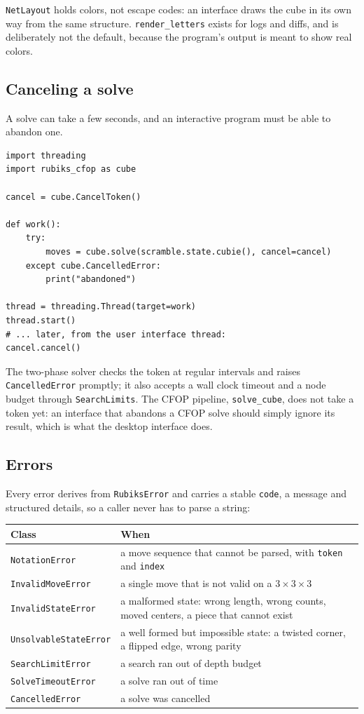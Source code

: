\texttt{NetLayout} holds colors, not escape codes: an interface draws the cube in
its own way from the same structure.  \texttt{render\_letters} exists for logs and
diffs, and is deliberately not the default, because the program's output is meant to
show real colors.

\subsection{Canceling a solve}

A solve can take a few seconds, and an interactive program must be able to abandon
one.

\begin{lstlisting}[style=python]
import threading
import rubiks_cfop as cube

cancel = cube.CancelToken()

def work():
    try:
        moves = cube.solve(scramble.state.cubie(), cancel=cancel)
    except cube.CancelledError:
        print("abandoned")

thread = threading.Thread(target=work)
thread.start()
# ... later, from the user interface thread:
cancel.cancel()
\end{lstlisting}

The two-phase solver checks the token at regular intervals and raises
\texttt{CancelledError} promptly; it also accepts a wall clock timeout and a node
budget through \texttt{SearchLimits}.  The CFOP pipeline, \texttt{solve\_cube}, does
not take a token yet: an interface that abandons a CFOP solve should simply ignore
its result, which is what the desktop interface does.

\subsection{Errors}

Every error derives from \texttt{RubiksError} and carries a stable \texttt{code}, a
message and structured details, so a caller never has to parse a string:

\begin{center}
\begin{tabular}{@{}ll@{} }
\toprule
Class & When \\
\midrule
\texttt{NotationError} & a move sequence that cannot be parsed, with
\texttt{token} and \texttt{index} \\
\texttt{InvalidMoveError} & a single move that is not valid on a $3\times3\times3$ \\
\texttt{InvalidStateError} & a malformed state: wrong length, wrong counts, moved
centers, a piece that cannot exist \\
\texttt{UnsolvableStateError} & a well formed but impossible state: a twisted
corner, a flipped edge, wrong parity \\
\texttt{SearchLimitError} & a search ran out of depth budget \\
\texttt{SolveTimeoutError} & a solve ran out of time \\
\texttt{CancelledError} & a solve was cancelled \\
\bottomrule
\end{tabular}
\end{center}

